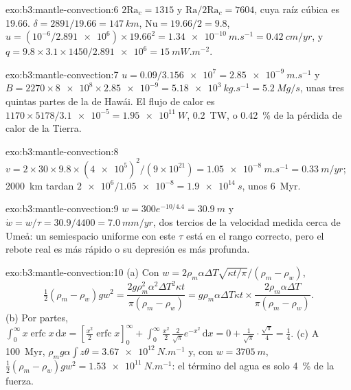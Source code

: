 \begin{solution}{exo:b3:mantle-convection:6}
$2\mathrm{Ra}_c = 1315$ y $\mathrm{Ra}/2\mathrm{Ra}_c = 7604$, cuya raíz cúbica
es 19.66. $\delta = 2891/19.66 = \qty{147}{km}$, $\mathrm{Nu} = 19.66/2 =
9.8$, $u = (10^{-6}/\num{2.891e6})\times19.66^2 = \qty{1.34e-10}{m.s^{-1}} =
\qty{0.42}{cm/yr}$, y $q = 9.8\times3.1\times1450/\num{2.891e6} =
\qty{15}{mW.m^{-2}}$.
\end{solution}

\begin{solution}{exo:b3:mantle-convection:7}
$u = 0.09/\num{3.156e7} = \qty{2.85e-9}{m.s^{-1}}$ y $B = 2270\times\num{8e8}
\times\num{2.85e-9} = \qty{5.18e3}{kg.s^{-1}} = \qty{5.2}{Mg/s}$, unas
tres quintas partes de la de Hawái. El flujo de calor es $1170\times5178/\num{3.1e-5} =
\qty{1.95e11}{W}$, \qty{0.2}{TW}, o \qty{0.42}{\percent} de la pérdida de
calor de la Tierra.
\end{solution}

\begin{solution}{exo:b3:mantle-convection:8}
$v = 2\times30\times9.8\times(\num{4e5})^2/(9\times10^{21}) =
\qty{1.05e-8}{m.s^{-1}} = \qty{0.33}{m/yr}$; \qty{2000}{km} tardan
$\num{2e6}/\num{1.05e-8} = \qty{1.9e14}{s}$, unos \qty{6}{Myr}.
\end{solution}

\begin{solution}{exo:b3:mantle-convection:9}
$w = 300e^{-10/4.4} = \qty{30.9}{m}$ y $\dot w = w/\tau = 30.9/4400 =
\qty{7.0}{mm/yr}$, dos tercios de la velocidad medida cerca de Umeå: un
semiespacio uniforme con este $\tau$ está en el rango correcto, pero el rebote real es
más rápido o su depresión es más profunda.
\end{solution}

\begin{solution}{exo:b3:mantle-convection:10}
(a) Con $w = 2\rho_m\alpha\Delta T\sqrt{\kappa t/\pi}/(\rho_m - \rho_w)$,
\[
  \tfrac12(\rho_m - \rho_w)gw^2 = \frac{2g\rho_m^2\alpha^2\Delta T^2\kappa t}
  {\pi(\rho_m - \rho_w)} = g\rho_m\alpha\Delta T\kappa t\times
  \frac{2\rho_m\alpha\Delta T}{\pi(\rho_m - \rho_w)} .
\] (b) Por partes,
$\int_0^\infty x\operatorname{erfc}x\,\mathrm dx = [\tfrac{x^2}2\operatorname{erfc}
x]_0^\infty + \int_0^\infty\tfrac{x^2}2\,\tfrac2{\sqrt\pi}e^{-x^2}\,\mathrm dx =
0 + \tfrac1{\sqrt\pi}\cdot\tfrac{\sqrt\pi}4 = \tfrac14$. (c) A \qty{100}{Myr},
$\rho_mg\alpha\int z\theta = \qty{3.67e12}{N.m^{-1}}$ y, con $w =
\qty{3705}{m}$, $\tfrac12(\rho_m - \rho_w)gw^2 = \qty{1.53e11}{N.m^{-1}}$: el
término del agua es solo \qty{4}{\percent} de la fuerza.
\end{solution}

